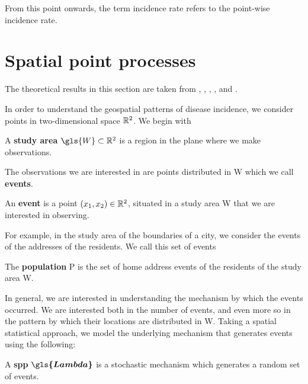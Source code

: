 From this point onwards, the term \gls{incidence rate} refers to the point-wise \gls{incidence rate}.

\section{Spatial point processes}
\label{sec:theory:spatial_point_processes}

The theoretical results in this section are taken from \citet{diggle2014statistical},
\citet{diggle1988equivalence},
\citet{guan2008consistent},
\citet{silverman1986density},
and \citet{wand1994kernel}.

In order to understand the geospatial patterns of disease incidence,
we consider points in two-dimensional space $\mathbb{R}^2$.
We begin with

\begin{defn}
    \label{defn:studyarea}
    A \textbf{study area} $\gls{W} \subset \RS$ is a region in the plane where we make observations.
\end{defn}

The observations we are interested in are points distributed in \gls{W} which we call \textbf{events}.

\begin{defn}
    \label{defn:event}
    An \textbf{event} is a point $(x_1, x_2) \in \mathbb{R}^2$, situated in a study area \gls{W} that we are interested in observing.
\end{defn}

For example, in the study area of the boundaries of a city, we consider the events of the addresses of the residents.
We call this set of events

\begin{defn}
    The \textbf{population} \gls{P} is the set of home address events of the residents of the study area \gls{W}.
\end{defn}

In general, we are interested in understanding the mechanism by which the events occurred.
We are interested both in the number of events, and even more so in the pattern by which their locations are distributed in \gls{W}.
Taking a spatial statistical approach, we model the underlying mechanism that generates events using the following:

\begin{defn}
    \label{defn:spp}
    A \textbf{\gls{spp}} $\boldsymbol{\gls{Lambda}}$ is a stochastic mechanism which generates a random set of events.
\end{defn}

